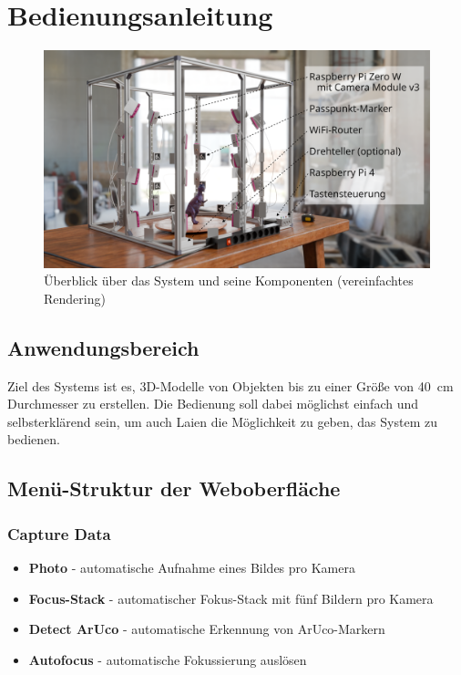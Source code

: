 \documentclass[./00PhotoBox.tex]{subfiles}
\begin{document}
\chapter{Bedienungsanleitung}
\label{ch:Bedienungsanleitung}

\begin{figure}[ht]
    \centering
    \includegraphics[width=1\textwidth]{./img/9_anleitung/komponenten.pdf}
    \caption{Überblick über das System und seine Komponenten (vereinfachtes Rendering)}
    \label{img:komponenten}
\end{figure}

\section{Anwendungsbereich}
Ziel des Systems ist es, 3D-Modelle von Objekten bis zu einer Größe von \SI{40}{\centi\metre} Durchmesser zu erstellen. Die Bedienung soll dabei möglichst einfach und selbsterklärend sein, um auch Laien die Möglichkeit zu geben, das System zu bedienen.

\section{Menü-Struktur der Weboberfläche}
\subsection{\foreignlanguage{british}{Capture Data}}
\begin{itemize}
    \item \textbf{\foreignlanguage{british}{Photo}} - au\-to\-ma\-tische Aufnahme eines Bildes pro Kamera
    \item \textbf{\foreignlanguage{british}{Focus-Stack}} - au\-to\-ma\-tischer Fokus-Stack mit fünf Bildern pro Kamera
    \item \textbf{\foreignlanguage{british}{Detect ArUco}} - au\-to\-ma\-tische Erkennung von ArUco-Markern
    \item \textbf{\foreignlanguage{british}{Autofocus}} - au\-to\-ma\-tische Fokussierung auslösen
\end{itemize}
\end{document}
